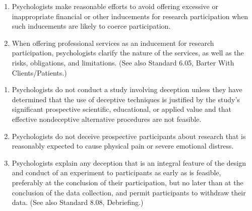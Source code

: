 \begin{fullwidth}
\begin{enumerate}
\end{enumerate}








\begin{enumerate}


\item Psychologists make reasonable efforts to avoid offering excessive or inappropriate financial or other inducements for research participation when such inducements are likely to coerce participation.




\item When offering professional services as an inducement for research participation, psychologists clarify the nature of the services, as well as the risks, obligations, and limitations. (See also Standard 6.05, Barter With Clients/Patients.)


\end{enumerate}





\begin{enumerate}

\item Psychologists do not conduct a study involving deception unless they have determined that the use of
deceptive techniques is justified by the study's significant prospective scientific, educational, or applied value and that effective nondeceptive alternative procedures are not feasible.


\item Psychologists do not deceive prospective participants about research that is reasonably expected to cause physical pain or severe emotional distress.


\item Psychologists explain any deception that is an integral feature of the design and conduct of an experiment to participants as early as is feasible, preferably at the conclusion of their participation, but no later than at the conclusion of the data collection, and permit participants to withdraw their data. (See also Standard 8.08, Debriefing.)

\end{enumerate}



\begin{enumerate}


\end{enumerate}
\end{fullwidth}
